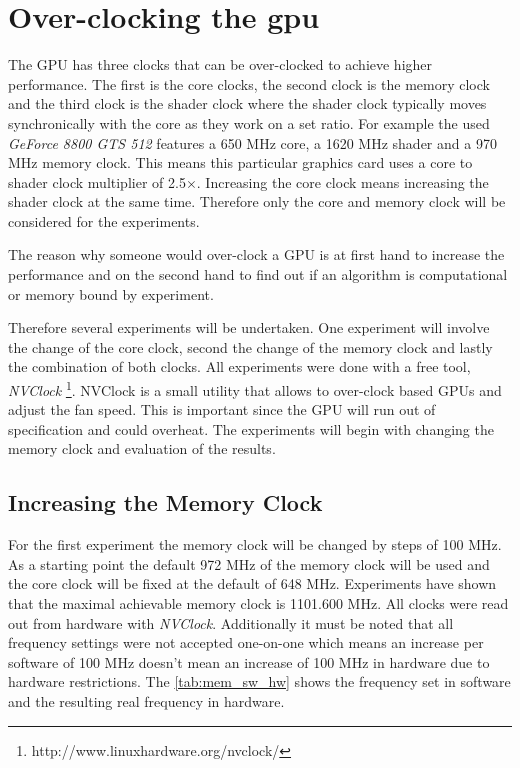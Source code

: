
\section{Over-clocking the gpu} %
\label{sec:overclocking_the_gpu}
The \gls{GPU} has three \glspl{clock} that can be over-clocked to achieve higher
performance. The first is the core \glspl{clock}, the second \gls{clock} is
the memory clock and the third clock is the \gls{shader} \gls{clock} where the
shader clock typically moves synchronically with the core as they work on a set
ratio. For example the used \emph{GeForce 8800 GTS 512} features a 650 \gls{MHz}
core, a 1620 \gls{MHz} shader and a 970 \gls{MHz} memory clock. This means this
particular graphics card uses a core to shader \gls{clock} multiplier of
2.5$\times$. Increasing the core \gls{clock} means increasing the shader clock
at the same time. Therefore only the core and memory clock will be considered
for the experiments.

The reason why someone would over-clock a \gls{GPU} is at first hand to increase
the performance and on the second hand to find out if an algorithm is
computational or memory bound by experiment.

Therefore several experiments will be undertaken. One experiment will involve
the change of the core \gls{clock}, second the change of the memory \gls{clock}
and lastly the combination of both \glspl{clock}. All experiments were done with
a free tool, \emph{NVClock}
\footnote{http://www.linuxhardware.org/nvclock/}. NVClock is a small utility
that allows to over-clock {} based \glspl{GPU} and adjust the fan speed. This
is important since the \gls{GPU} will run out of specification and could overheat.
The experiments will begin with changing the memory clock and evaluation of the
results. 


\subsection{Increasing the Memory Clock} %
\label{sub:increasing_the_memory_clcok}
For the first experiment the memory clock will be changed by steps of 100 \gls{MHz}.
As a starting point the default 972 \gls{MHz} of the memory clock will be used 
and the core clock will be fixed at the default of 648 \gls{MHz}. Experiments 
have shown that the maximal achievable memory clock is 1101.600 \gls{MHz}. 
All clocks were read out from hardware with \emph{NVClock}. Additionally it must
be noted that all frequency settings were not accepted one-on-one which means an 
increase per software of 100 \gls{MHz} doesn't mean an increase of 100 \gls{MHz}
in hardware due to hardware restrictions. The \autoref{tab:mem_sw_hw} shows the 
frequency set in software and the resulting real frequency in hardware. 

